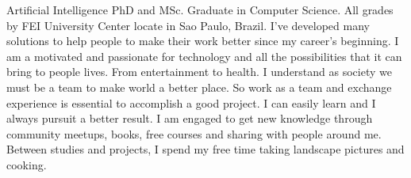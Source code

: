 

\begin{cvparagraph}

Artificial Intelligence PhD and MSc. Graduate in Computer Science. All grades by FEI University Center locate in Sao Paulo, Brazil. I've developed many solutions to help people to make their work better since my career's beginning. I am a motivated and passionate for technology and all the possibilities that it can bring to people lives. From entertainment to health. I understand as society we must be a team to make world a better place. So work as a team and exchange experience is essential to accomplish a good project. I can easily learn and I always pursuit a better result. I am engaged to get new knowledge through community meetups, books, free courses and sharing with people around me. Between studies and projects, I spend my free time taking landscape pictures and cooking.
\end{cvparagraph}
